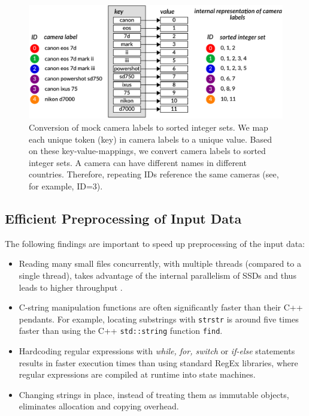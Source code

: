 \documentclass[sigconf]{acmart}
\begin{document}
\begin{figure}[htbp]
  \centering
  \includegraphics[width=\linewidth]{./graphics/integer_sets.pdf}
  \caption{Conversion of mock camera labels to sorted integer sets. 
We map each unique token (key) in camera labels to a unique value. 
Based on these key-value-mappings, we convert camera labels to sorted integer sets. 
A camera can have different names in different countries. Therefore, repeating IDs reference the same cameras (see, for example, ID=3).} 
  \label{fig:integer:sets}
\end{figure}

\subsection{Efficient Preprocessing of Input Data}
\label{sub:sec:preprocessing}

The following findings are important to speed up preprocessing of the input data:

\begin{itemize}
\item Reading many small files concurrently, with multiple threads (compared to a single thread), takes advantage of the internal parallelism of SSDs and thus leads to higher throughput \cite{Zhuang2016}.

\item C-string manipulation functions are often significantly faster than their C++ pendants. For example, locating substrings with \texttt{strstr} is around five times faster than using the C++ \texttt{std::string} function \texttt{find}.

\item Hardcoding regular expressions with \emph{while, for, switch} or \emph{if-else} statements results in faster execution times than using standard RegEx libraries, where regular expressions are compiled at runtime into state machines.

\item Changing strings in place, instead of treating them as immutable objects, eliminates allocation and copying overhead.

\end{itemize}
\end{document}
